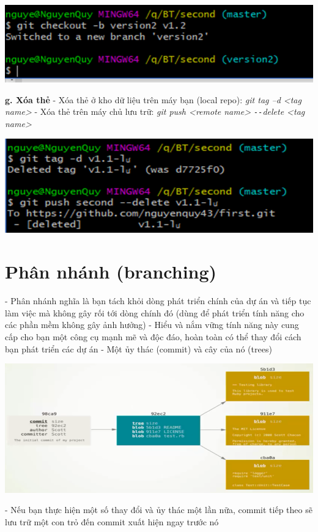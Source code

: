 \documentclass[12pt,a4paper]{report}
\begin{document}
	\includegraphics[width=0.8\linewidth]{screenshot046}

	\label{fig:screenshot046}
\vskip 0.4cm\vskip 0.4cm
{\bf g. Xóa thẻ}\vskip 0.4cm
- Xóa thẻ ở kho dữ liệu trên máy bạn (local repo): {\it  git tag –d <tag name>}\vskip 0.4cm
- Xóa thẻ trên máy chủ lưu trữ: {\it git push <remote name> \texttt{-{}-}delete <tag name>}\vskip 0.4cm

	\includegraphics[width=0.8\linewidth]{screenshot047}
	
	\label{fig:screenshot047}




				
\section{Phân nhánh (branching)}
\hspace{0.6cm}- Phân nhánh nghĩa là bạn tách khỏi dòng phát triển chính của dự án và tiếp tục làm việc mà không gây rối tới dòng chính đó (dùng để phát triển tính năng cho các phần mềm không gây ảnh hưởng)\vskip 0.4cm
- Hiểu và nắm vững tính năng này cung cấp cho bạn một công cụ mạnh mẽ và độc đáo, hoàn toàn có thể thay đổi cách bạn phát triển các dự án\vskip 0.4cm
- Một ủy thác (commit) và cây của nó (trees)\vskip 0.4cm

	\includegraphics[width=0.8\linewidth]{screenshot048}

	\label{fig:screenshot048}
\vskip 0.4cm\vskip 0.4cm
- Nếu bạn thực hiện một số thay đổi và ủy thác một lần nữa, commit tiếp theo sẽ lưu trữ một con trỏ đến commit xuất hiện ngay trước nó\vskip 0.4cm
\end{document}
